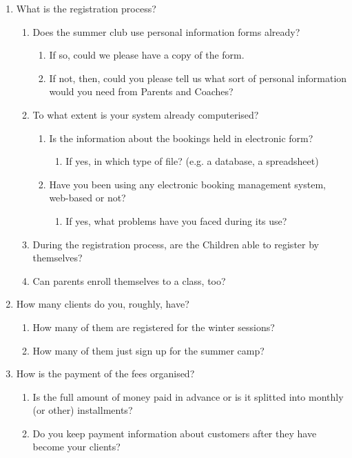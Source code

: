 \documentclass{l3proj}
\begin{document}
\begin{enumerate}
\item What is the registration process? 
		\begin{enumerate}
	\item Does the summer club use personal information forms already?
			\begin{enumerate}
			\item If so, could we please have a copy of the form.
			\item If not, then, could you please tell us what sort of personal information would you need from Parents and Coaches?
			\end{enumerate}
	\item To what extent is your system already computerised?
			\begin{enumerate}
			\item Is the information about the bookings held in electronic form? 
				\begin{enumerate}
				\item If yes, in which type of file? (e.g. a database, a spreadsheet)
				\end{enumerate}
			\item Have you been using any electronic booking management system, web-based or not? 
				\begin{enumerate}
				\item If yes, what problems have you faced during its use?
				\end{enumerate}
			\end{enumerate}
	\item During the registration process, are the Children able to register by themselves?
	\item Can parents enroll themselves to a class, too?
	\end{enumerate}
\item How many clients do you, roughly, have?
			\begin{enumerate}
			\item How many of them are registered for the winter sessions?
			\item How many of them just sign up for the summer camp?
			\end{enumerate}
\item How is the payment of the fees organised?
		\begin{enumerate}
		\item Is the full amount of money paid in advance or is it splitted into monthly (or other) installments?
		\item Do you keep payment information about customers after they have become your clients?

\end{enumerate}
\end{enumerate}
\end{document}
